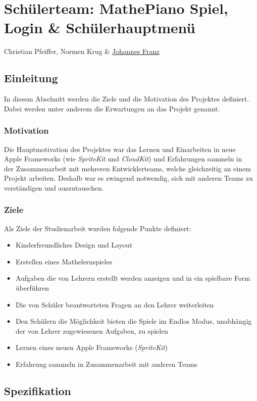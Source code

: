 \chapter{Schülerteam: MathePiano Spiel, Login \& Schülerhauptmenü}
Christian Pfeiffer, Normen Krug \& \href{mailto:jofranz90@gmail.com?subject=Swift-Studienarbeit}{Johannes Franz}


\section{Einleitung}
In diesem Abschnitt werden die Ziele und die Motivation des Projektes definiert. Dabei werden unter anderem die Erwartungen an das Projekt genannt.
\subsection{Motivation}
Die Hauptmotivation des Projektes war das Lernen und Einarbeiten in neue Apple Frameworks (wie \textit{SpriteKit} und \textit{CloudKit}) und Erfahrungen sammeln in der Zusammenarbeit mit mehreren Entwicklerteams, welche gleichzeitig an einem Projekt arbeiten. Deshalb war es zwingend notwendig, sich mit anderen Teams zu verständigen und auszutauschen.  

\subsection{Ziele}
Als Ziele der Studienarbeit wurden folgende Punkte definiert: 
\begin{itemize}
\item Kinderfreundliches Design und Layout
\item Erstellen eines Mathelernspieles 
\item Aufgaben die von Lehrern erstellt werden anzeigen und in ein spielbare Form überführen
\item Die von Schüler beantworteten Fragen an den Lehrer weiterleiten
\item Den Schülern die Möglichkeit bieten die Spiele im Endlos Modus, unabhängig der von Lehrer zugewiesenen Aufgaben, zu spielen
\item Lernen eines neuen Apple Frameworks (\textit{SpriteKit})
\item Erfahrung sammeln in Zusammenarbeit mit anderen Teams
\end{itemize}
\section{Spezifikation}


